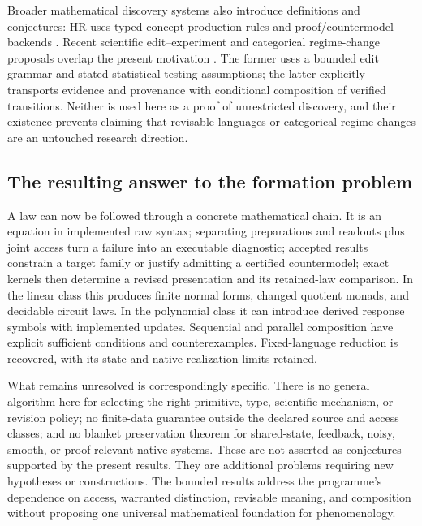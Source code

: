 \documentclass[11pt]{article}
\theoremstyle{definition}
\theoremstyle{remark}\newtheorem{remark}[theorem]{Remark}
\begin{document}
Broader mathematical discovery systems also introduce definitions and
conjectures: HR uses typed concept-production rules and proof/countermodel
backends \cite{hr}. Recent scientific edit--experiment and categorical
regime-change proposals overlap the present motivation
\cite{ma2026,wang2026}. The former uses a bounded edit grammar and stated
statistical testing assumptions; the latter explicitly transports evidence
and provenance with conditional composition of verified transitions.
Neither is used here as a proof of unrestricted discovery, and their
existence prevents claiming that revisable languages or categorical
regime changes are an untouched research direction.

\subsection{The resulting answer to the formation problem}
A law can now be followed through a concrete mathematical chain. It is an
equation in implemented raw syntax; separating preparations and readouts
plus joint access turn a failure into an executable diagnostic; accepted
results constrain a target family or justify admitting a certified
countermodel; exact kernels then determine a revised presentation and its
retained-law comparison. In the linear class this produces finite normal
forms, changed quotient monads, and decidable circuit laws. In the polynomial
class it can introduce derived response symbols with implemented updates.
Sequential and parallel composition have explicit sufficient conditions
and counterexamples. Fixed-language reduction is recovered, with its state
and native-realization limits retained.

What remains unresolved is correspondingly specific. There is no general
algorithm here for selecting the right primitive, type, scientific mechanism,
or revision policy; no finite-data guarantee outside the declared source
and access classes; and no blanket preservation theorem for shared-state,
feedback, noisy, smooth, or proof-relevant native systems. These are not
asserted as conjectures supported by the present results. They are additional
problems requiring new hypotheses or constructions. The bounded results
address the programme's dependence on access, warranted distinction,
revisable meaning, and composition without proposing one universal
mathematical foundation for phenomenology.
\end{document}
